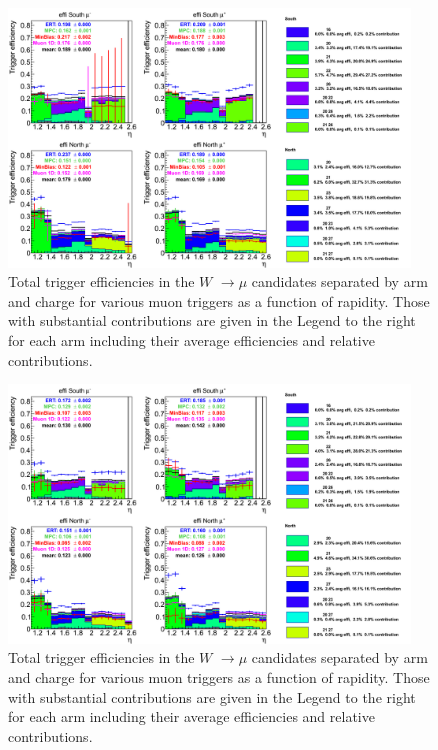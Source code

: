 \begin{figure}[ht]
\begin{center}
\includegraphics[width=0.95\textwidth]{./figures/totaltrigeffi13_all_wpt0.png}
\caption{\label{fig:totaltrigeffi_all_wpt0} Total trigger efficiencies in the $W$ $\rightarrow \mu$ candidates separated by arm and charge for various muon triggers as a function of rapidity. Those with substantial contributions are given in the Legend to the right for each arm including their average efficiencies and relative contributions.}
\end{center}
\end{figure}
\begin{figure}[ht]
\begin{center}
\includegraphics[width=0.95\textwidth]{./figures/totaltrigeffi13_all_wpt1.png}
\caption{\label{fig:totaltrigeffi_all_wpt1} Total trigger efficiencies in the $W$ $\rightarrow \mu$ candidates separated by arm and charge for various muon triggers as a function of rapidity. Those with substantial contributions are given in the Legend to the right for each arm including their average efficiencies and relative contributions.}
\end{center}
\end{figure}

